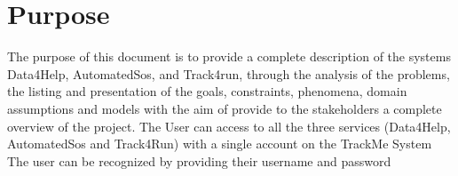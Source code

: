 \section{Purpose}
The purpose of this document is to provide a complete description of the systems Data4Help, AutomatedSos, and Track4run, through the analysis of the problems, the listing and presentation of the goals, constraints, phenomena, domain assumptions and models with the aim of provide to the stakeholders a complete overview of the project.
\newline \newline
[G1] The User can access to all the three services (Data4Help, AutomatedSos and Track4Run) with a single account on the TrackMe System \newline \newline
 [G2]The user can be recognized by providing their username and password \newline

